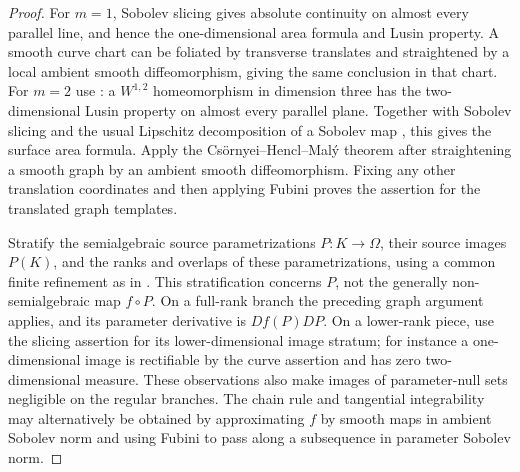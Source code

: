 \documentclass[11pt]{article}
\numberwithin{equation}{section}
\theoremstyle{definition}
\theoremstyle{remark}
\begin{document}
\begin{proof}
For $m=1$, Sobolev slicing gives absolute continuity on almost every
parallel line, and hence the one-dimensional area formula and Lusin
property.  A smooth curve chart can be foliated by transverse
translates and straightened by a local ambient smooth diffeomorphism,
giving the same conclusion in that chart.  For $m=2$ use
\cite[Theorem~1.3]{CsornyeiHenclMaly2010}: a $W^{1,2}$ homeomorphism
in dimension three has the two-dimensional Lusin property on almost
every parallel plane.  Together with Sobolev slicing and the usual
Lipschitz decomposition of a Sobolev map
\cite[Theorem~3(1)]{BojarskiHajlasz1993}, this gives the surface area
formula. Apply the Cs\"ornyei--Hencl--Mal\'y theorem after straightening a smooth graph
by an ambient smooth diffeomorphism.  Fixing any other translation
coordinates and then applying Fubini proves the assertion for the
translated graph templates.

Stratify the semialgebraic source parametrizations $P:K\to\Omega$,
their source images $P(K)$, and the ranks and overlaps of these
parametrizations, using a common finite refinement as in
\cite[Proposition~2.3 and Lemma~2.5]{HardtLambrechtsTurchinVolic2011}.
This stratification concerns $P$, not the generally non-semialgebraic
map $f\circ P$. On a full-rank branch the preceding graph argument applies,
and its parameter derivative is $Df(P)DP$.  On a lower-rank piece,
use the slicing assertion for its lower-dimensional image stratum;
for instance a one-dimensional image is rectifiable by the curve
assertion and has zero two-dimensional measure.  These observations
also make images of parameter-null sets negligible on the regular
branches.  The chain rule and tangential integrability may alternatively
be obtained by approximating $f$ by smooth maps in ambient Sobolev norm
and using Fubini to pass along a subsequence in parameter Sobolev norm.


\end{proof}
\end{document}
